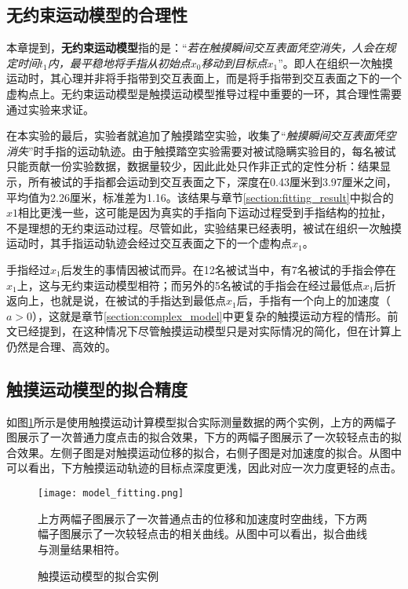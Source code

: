 \subsection{无约束运动模型的合理性}

本章提到，\textbf{无约束运动模型}指的是：“\emph{若在触摸瞬间交互表面凭空消失，人会在规定时间$t_1$内，最平稳地将手指从初始点$x_0$移动到目标点$x_1$}”。即人在组织一次触摸运动时，其心理并非将手指带到交互表面上，而是将手指带到交互表面之下的一个虚构点上。无约束运动模型是触摸运动模型推导过程中重要的一环，其合理性需要通过实验来求证。


在本实验的最后，实验者就追加了触摸踏空实验，收集了“\emph{触摸瞬间交互表面凭空消失}”时手指的运动轨迹。由于触摸踏空实验需要对被试隐瞒实验目的，每名被试只能贡献一份实验数据，数据量较少，因此此处只作非正式的定性分析：结果显示，所有被试的手指都会运动到交互表面之下，深度在0.43厘米到3.97厘米之间，平均值为2.26厘米，标准差为1.16。该结果与章节\ref{section:fitting_result}中拟合的$x1$相比更浅一些，这可能是因为真实的手指向下运动过程受到手指结构的拉扯，不是理想的无约束运动过程。尽管如此，实验结果已经表明，被试在组织一次触摸运动时，其手指运动轨迹会经过交互表面之下的一个虚构点$x_1$。

手指经过$x_1$后发生的事情因被试而异。在12名被试当中，有7名被试的手指会停在$x_1$上，这与无约束运动模型相符；而另外的5名被试的手指会在经过最低点$x_1$后折返向上，也就是说，在被试的手指达到最低点$x_1$后，手指有一个向上的加速度（$a>0$），这就是章节\ref{section:complex_model}中更复杂的触摸运动方程的情形。前文已经提到，在这种情况下尽管触摸运动模型只是对实际情况的简化，但在计算上仍然是合理、高效的。

\subsection{触摸运动模型的拟合精度}

如图\ref{fig:model_fitting}所示是使用触摸运动计算模型拟合实际测量数据的两个实例，上方的两幅子图展示了一次普通力度点击的拟合效果，下方的两幅子图展示了一次较轻点击的拟合效果。左侧子图是对触摸运动位移的拟合，右侧子图是对加速度的拟合。从图中可以看出，下方触摸运动轨迹的目标点深度更浅，因此对应一次力度更轻的点击。

\begin{figure}
	\centering
	\texttt{[image: model\_fitting.png]}
	\caption*{上方两幅子图展示了一次普通点击的位移和加速度时空曲线，下方两幅子图展示了一次较轻点击的相关曲线。从图中可以看出，拟合曲线与测量结果相符。}
	\caption{触摸运动模型的拟合实例}
	\label{fig:model_fitting}
\end{figure}

